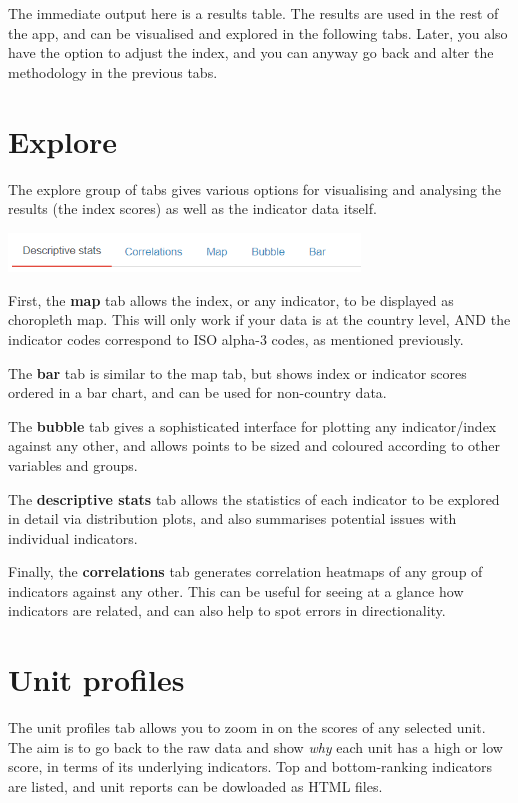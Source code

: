 \documentclass[
  letterpaper,
  DIV=11,
  numbers=noendperiod]{scrreprt}
\begin{document}
The immediate output here is a results table. The results are used in
the rest of the app, and can be visualised and explored in the following
tabs. Later, you also have the option to adjust the index, and you can
anyway go back and alter the methodology in the previous tabs.

\hypertarget{explore}{%
\section{Explore}\label{explore}}

The explore group of tabs gives various options for visualising and
analysing the results (the index scores) as well as the indicator data
itself.

\includegraphics[width=0.7\textwidth,height=\textheight]{figs/explore_tabs.png}

First, the \textbf{map} tab allows the index, or any indicator, to be
displayed as choropleth map. This will only work if your data is at the
country level, AND the indicator codes correspond to ISO alpha-3 codes,
as mentioned previously.

The \textbf{bar} tab is similar to the map tab, but shows index or
indicator scores ordered in a bar chart, and can be used for non-country
data.

The \textbf{bubble} tab gives a sophisticated interface for plotting any
indicator/index against any other, and allows points to be sized and
coloured according to other variables and groups.

The \textbf{descriptive stats} tab allows the statistics of each
indicator to be explored in detail via distribution plots, and also
summarises potential issues with individual indicators.

Finally, the \textbf{correlations} tab generates correlation heatmaps of
any group of indicators against any other. This can be useful for seeing
at a glance how indicators are related, and can also help to spot errors
in directionality.

\hypertarget{unit-profiles}{%
\section{Unit profiles}\label{unit-profiles}}

The unit profiles tab allows you to zoom in on the scores of any
selected unit. The aim is to go back to the raw data and show \emph{why}
each unit has a high or low score, in terms of its underlying
indicators. Top and bottom-ranking indicators are listed, and unit
reports can be dowloaded as HTML files.
\end{document}

